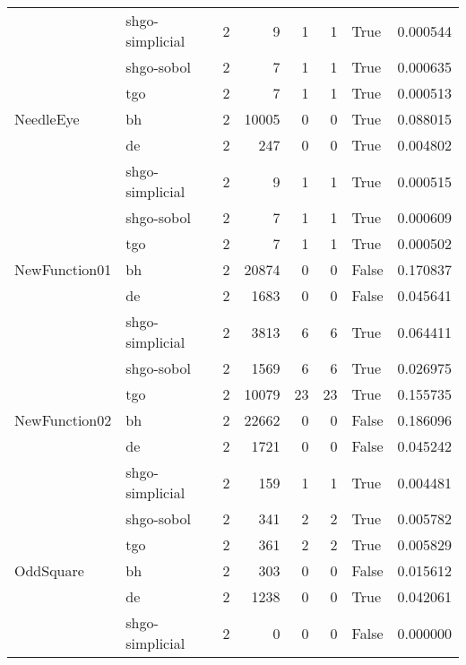 \begin{longtable}{llrrrrlr}
         & shgo-simplicial &     2 &        9 &      1 &       1 &    True &    0.000544 \\
         & shgo-sobol &     2 &        7 &      1 &       1 &    True &    0.000635 \\
         & tgo &     2 &        7 &      1 &       1 &    True &    0.000513 \\
NeedleEye & bh &     2 &    10005 &      0 &       0 &    True &    0.088015 \\
         & de &     2 &      247 &      0 &       0 &    True &    0.004802 \\
         & shgo-simplicial &     2 &        9 &      1 &       1 &    True &    0.000515 \\
         & shgo-sobol &     2 &        7 &      1 &       1 &    True &    0.000609 \\
         & tgo &     2 &        7 &      1 &       1 &    True &    0.000502 \\
NewFunction01 & bh &     2 &    20874 &      0 &       0 &   False &    0.170837 \\
         & de &     2 &     1683 &      0 &       0 &   False &    0.045641 \\
         & shgo-simplicial &     2 &     3813 &      6 &       6 &    True &    0.064411 \\
         & shgo-sobol &     2 &     1569 &      6 &       6 &    True &    0.026975 \\
         & tgo &     2 &    10079 &     23 &      23 &    True &    0.155735 \\
NewFunction02 & bh &     2 &    22662 &      0 &       0 &   False &    0.186096 \\
         & de &     2 &     1721 &      0 &       0 &   False &    0.045242 \\
         & shgo-simplicial &     2 &      159 &      1 &       1 &    True &    0.004481 \\
         & shgo-sobol &     2 &      341 &      2 &       2 &    True &    0.005782 \\
         & tgo &     2 &      361 &      2 &       2 &    True &    0.005829 \\
OddSquare & bh &     2 &      303 &      0 &       0 &   False &    0.015612 \\
         & de &     2 &     1238 &      0 &       0 &    True &    0.042061 \\
         & shgo-simplicial &     2 &        0 &      0 &       0 &   False &    0.000000 \\

\end{longtable}
